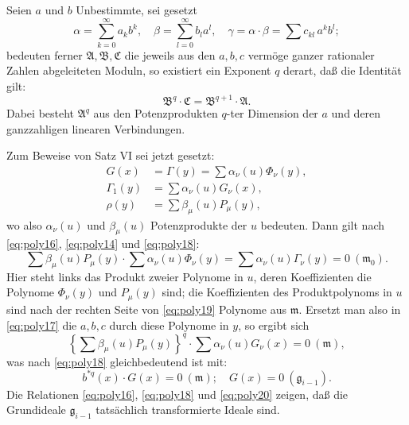 \documentclass[fontsize=10pt,paper=a5,pagesize,headings=small]{scrbook}
\newcommand{\ideal}[1]{\mathfrak{#1}}
\theoremstyle{plain}
\begin{document}
Seien $a$ und $b$ Unbestimmte, sei gesetzt
\[ \alpha = \sum_{k=0}^{\infty} a_k b^k,\quad \beta = \sum_{l=0}^{\infty} b_l a^l,\quad \gamma = \alpha \cdot \beta = \sum c_{kl}\,a^k b^l; \]
bedeuten ferner $\mathfrak{A}, \mathfrak{B}, \mathfrak{C}$ die jeweils aus den $a,b,c$ vermöge ganzer rationaler Zahlen
abgeleiteten Moduln, so existiert ein Exponent $q$ derart, daß die Identität gilt:
\begin{equation}
\label{eq:poly17}
\mathfrak{B}^q \cdot \mathfrak{C} = \mathfrak{B}^{q+1} \cdot \mathfrak{A}.
\end{equation}
Dabei besteht $\mathfrak{A}^q$ aus den Potenzprodukten $q$-ter Dimension der $a$ und deren ganzzahligen
linearen Verbindungen.

\newpage
\setcounter{page}{433}

Zum Beweise von Satz VI sei jetzt gesetzt:
\begin{equation}
\label{eq:poly18}
\begin{aligned}
G(x) &= \Gamma(y) = \sum \alpha_\nu(u) \Phi_\nu(y),\\
\Gamma_1(y) &= \sum \alpha_\nu(u) G_\nu(x),\\
\rho(y) &= \sum \beta_\mu(u) P_\mu(y),
\end{aligned}
\end{equation}
wo also $\alpha_\nu(u)$ und $\beta_\mu(u)$ Potenzprodukte der $u$ bedeuten. Dann gilt nach
\eqref{eq:poly16}, \eqref{eq:poly14} und \eqref{eq:poly18}:
\begin{equation}
\label{eq:poly19}
\sum \beta_\mu(u) P_\mu(y) \cdot \sum \alpha_\nu(u) \Phi_\nu(y) = \sum \alpha_\nu(u) \Gamma_\nu(y) = 0\ (\ideal{m}_0).
\end{equation}
Hier steht links das Produkt zweier Polynome in $u$, deren Koeffizienten die Polynome
$\Phi_\nu(y)$ und $P_\mu(y)$ sind; die Koeffizienten des Produktpolynoms in $u$ sind nach der
rechten Seite von \eqref{eq:poly19} Polynome aus $\ideal{m}$. Ersetzt man also in
\eqref{eq:poly17} die $a,b,c$ durch diese Polynome in $y$, so ergibt sich
\[ \left\{\sum \beta_\mu(u) P_\mu(y)\right\}^q \cdot \sum \alpha_\nu(u) G_\nu(x) = 0\ (\ideal{m}), \]
was nach \eqref{eq:poly18} gleichbedeutend ist mit:
\begin{equation}
\label{eq:poly20}
b^{*q}(x) \cdot G(x) = 0\ (\ideal{m});\quad G(x) = 0\ (\ideal{g}_{i-1}).
\end{equation}
Die Relationen \eqref{eq:poly16}, \eqref{eq:poly18} und \eqref{eq:poly20} zeigen, daß die
Grundideale $\ideal{g}_{i-1}$ tatsächlich transformierte Ideale sind.
\end{document}
